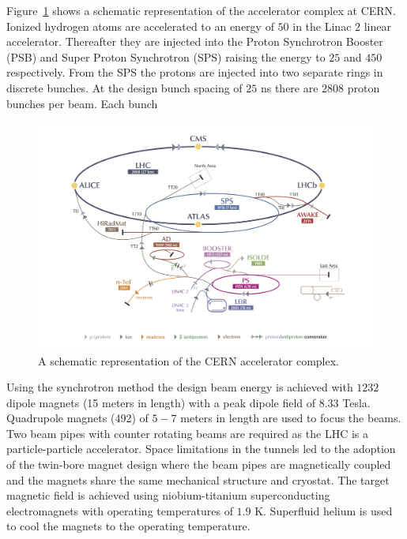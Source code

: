 Figure~\ref{fig:cern} shows a schematic representation of the accelerator complex at CERN. Ionized hydrogen atoms are accelerated to an energy of $50$ \MeV in the Linac $2$ linear accelerator. Thereafter they are injected into the Proton Synchrotron Booster (PSB) and Super Proton Synchrotron (SPS) raising the energy to $25$ \GeV and $450$ \GeV respectively. From the SPS the protons are injected into two separate rings in discrete bunches. At the design bunch spacing of $25$ ns there are $2808$ proton bunches per beam. Each bunch 

\begin{figure}[h]
\centering
\includegraphics[width=1.0\columnwidth]{figures_chapter2/cern_complex.jpg}
\caption{A schematic representation of the CERN accelerator complex\cite{Haffner:1621894}.}
\label{fig:cern}
\end{figure}

Using the synchrotron method the design beam energy is achieved with $1232$ dipole magnets (15 meters in length) with a peak dipole field of $8.33$ Tesla. Quadrupole magnets (492) of $5-7$ meters in length are used to focus the beams. Two beam pipes with counter rotating beams are required as the LHC is a particle-particle accelerator.  Space limitations in the tunnels led to the adoption of the twin-bore\cite{Blewett:1971zzb} magnet design where the beam pipes are magnetically coupled and the magnets share the same mechanical structure and cryostat. The target magnetic field is achieved using niobium-titanium superconducting electromagnets with operating temperatures of $1.9$ K. Superfluid helium is used to cool the magnets to the operating temperature.   

